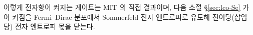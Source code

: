 이렇게 전자항이 켜지는 게이트는 MIT 의 직접 결과이며, 다음 소절 \S\ref{sec:lco-Se} 가 이 켜짐을
Fermi--Dirac 분포에서 Sommerfeld 전자 엔트로피로 유도해 전이당(삽입당) 전자 엔트로피 몫을 닫는다.
%

